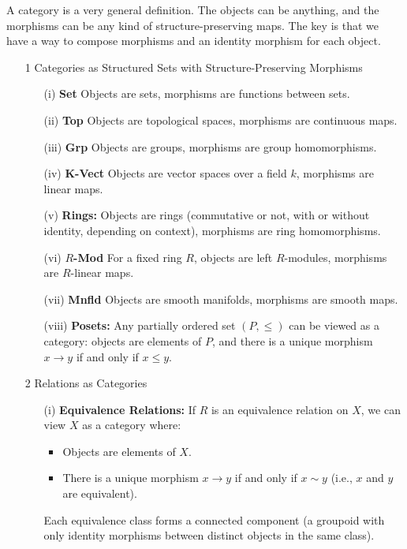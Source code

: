 \documentclass[11pt]{article}
\theoremstyle{definition}
\theoremstyle{plain}
\begin{document}
A category is a very general definition. The objects can be anything, and the morphisms can be any kind of structure-preserving maps. The key is that we have a way to compose morphisms and an identity morphism for each object.


\begin{itemize}
    \item [1]Categories as Structured Sets with Structure-Preserving Morphisms
          \begin{itemize}
              \item[(i)] \textbf{Set} Objects are sets, morphisms are functions between sets.
              \item[(ii)] \textbf{Top} Objects are topological spaces, morphisms are continuous maps.
              \item[(iii)] \textbf{Grp} Objects are groups, morphisms are group homomorphisms.
              \item[(iv)] \textbf{K-Vect} Objects are vector spaces over a field $k$, morphisms are linear maps.
              \item[(v)] \textbf{Rings:} Objects are rings (commutative or not, with or without identity, depending on context), morphisms are ring homomorphisms.
              \item[(vi)] \textbf{$R$-Mod} For a fixed ring $R$, objects are left $R$-modules, morphisms are $R$-linear maps.
              \item[(vii)] \textbf{Mnfld} Objects are smooth manifolds, morphisms are smooth maps.
              \item[(viii)] \textbf{Posets:} Any partially ordered set $(P, \leq)$ can be viewed as a category: objects are elements of $P$, and there is a unique morphism $x \to y$ if and only if $x \leq y$.
          \end{itemize}
    \item [2]Relations as Categories
          \begin{itemize}
              \item[(i)] \textbf{Equivalence Relations:} If $R$ is an equivalence relation on $X$, we can view $X$ as a category where:
                    \begin{itemize}
                        \item Objects are elements of $X$.
                        \item There is a unique morphism $x \to y$ if and only if $x \sim y$ (i.e., $x$ and $y$ are equivalent).

                    \end{itemize}
                    Each equivalence class forms a connected component (a groupoid with only identity morphisms between distinct objects in the same class).


\end{itemize}
\end{itemize}
\end{document}

